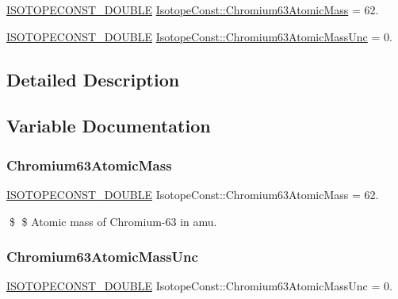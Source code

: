 \begin{DoxyCompactItemize}
\item 
\mbox{\hyperlink{group___isotope_const-_macros_ga8f45a7272ce02c0b4c65c44636ed719a}{I\+S\+O\+T\+O\+P\+E\+C\+O\+N\+S\+T\+\_\+\+D\+O\+U\+B\+LE}} \mbox{\hyperlink{group___isotope_const-_chromium-_cr63_ga628eca0ef43d4293139cd8ed4de700d4}{Isotope\+Const\+::\+Chromium63\+Atomic\+Mass}} = 62.
\item 
\mbox{\hyperlink{group___isotope_const-_macros_ga8f45a7272ce02c0b4c65c44636ed719a}{I\+S\+O\+T\+O\+P\+E\+C\+O\+N\+S\+T\+\_\+\+D\+O\+U\+B\+LE}} \mbox{\hyperlink{group___isotope_const-_chromium-_cr63_ga828dae32ae7df42a751b1979f9185e8f}{Isotope\+Const\+::\+Chromium63\+Atomic\+Mass\+Unc}} = 0.
\end{DoxyCompactItemize}


\subsection{Detailed Description}


\subsection{Variable Documentation}
\mbox{\label{group___isotope_const-_chromium-_cr63_ga628eca0ef43d4293139cd8ed4de700d4}} 
\subsubsection{\texorpdfstring{Chromium63\+Atomic\+Mass}{Chromium63AtomicMass}}
{\footnotesize\ttfamily \mbox{\hyperlink{group___isotope_const-_macros_ga8f45a7272ce02c0b4c65c44636ed719a}{I\+S\+O\+T\+O\+P\+E\+C\+O\+N\+S\+T\+\_\+\+D\+O\+U\+B\+LE}} Isotope\+Const\+::\+Chromium63\+Atomic\+Mass = 62.}

\$ \$ Atomic mass of Chromium-\/63 in amu. \mbox{\label{group___isotope_const-_chromium-_cr63_ga828dae32ae7df42a751b1979f9185e8f}} 
\subsubsection{\texorpdfstring{Chromium63\+Atomic\+Mass\+Unc}{Chromium63AtomicMassUnc}}
{\footnotesize\ttfamily \mbox{\hyperlink{group___isotope_const-_macros_ga8f45a7272ce02c0b4c65c44636ed719a}{I\+S\+O\+T\+O\+P\+E\+C\+O\+N\+S\+T\+\_\+\+D\+O\+U\+B\+LE}} Isotope\+Const\+::\+Chromium63\+Atomic\+Mass\+Unc = 0.}

